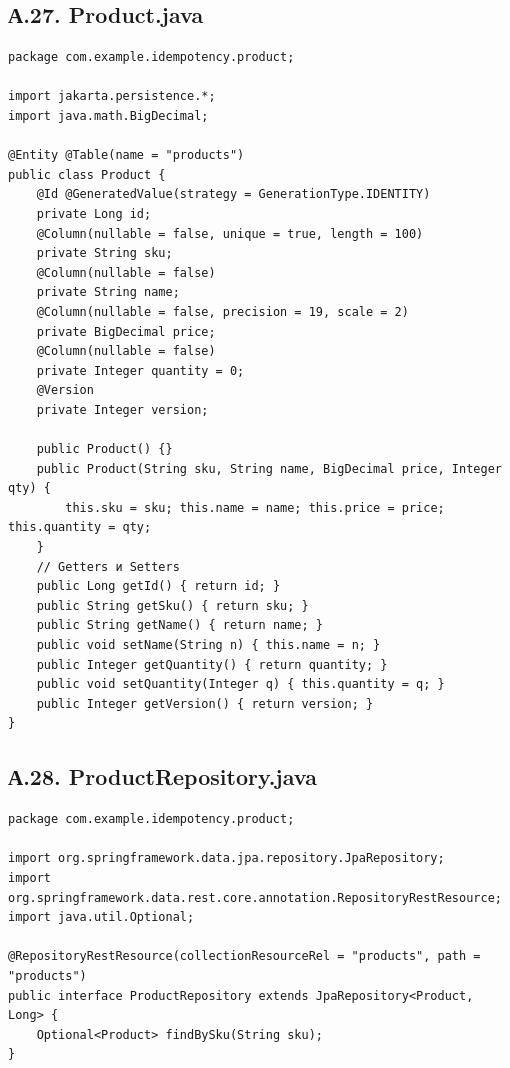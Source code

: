 
\subsection*{А.27. Product.java}
\begin{lstlisting}[caption={Product.java --- сущность с @Version для optimistic locking}]
package com.example.idempotency.product;

import jakarta.persistence.*;
import java.math.BigDecimal;

@Entity @Table(name = "products")
public class Product {
    @Id @GeneratedValue(strategy = GenerationType.IDENTITY)
    private Long id;
    @Column(nullable = false, unique = true, length = 100)
    private String sku;
    @Column(nullable = false)
    private String name;
    @Column(nullable = false, precision = 19, scale = 2)
    private BigDecimal price;
    @Column(nullable = false)
    private Integer quantity = 0;
    @Version
    private Integer version;

    public Product() {}
    public Product(String sku, String name, BigDecimal price, Integer qty) {
        this.sku = sku; this.name = name; this.price = price; this.quantity = qty;
    }
    // Getters и Setters
    public Long getId() { return id; }
    public String getSku() { return sku; }
    public String getName() { return name; }
    public void setName(String n) { this.name = n; }
    public Integer getQuantity() { return quantity; }
    public void setQuantity(Integer q) { this.quantity = q; }
    public Integer getVersion() { return version; }
}
\end{lstlisting}

\subsection*{А.28. ProductRepository.java}
\begin{lstlisting}[caption={ProductRepository.java --- тип контроллера \textnumero 3: Spring Data REST}]
package com.example.idempotency.product;

import org.springframework.data.jpa.repository.JpaRepository;
import org.springframework.data.rest.core.annotation.RepositoryRestResource;
import java.util.Optional;

@RepositoryRestResource(collectionResourceRel = "products", path = "products")
public interface ProductRepository extends JpaRepository<Product, Long> {
    Optional<Product> findBySku(String sku);
}
\end{lstlisting}

